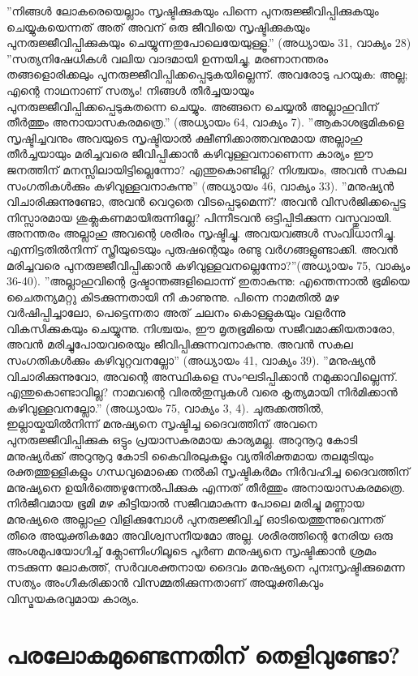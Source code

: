 ''നിങ്ങള്‍ ലോകരെയെല്ലാം സൃഷ്ടിക്കുകയും പിന്നെ പുനരുജ്ജീവിപ്പിക്കുകയും ചെയ്യുകയെന്നത് അത് അവന് ഒരു ജീവിയെ സൃഷ്ടിക്കുകയും പുനരുജ്ജീവിപ്പിക്കുകയും ചെയ്യുന്നതുപോലെയേയുള്ളൂ.'' (അധ്യായം 31, വാക്യം 28)
''സത്യനിഷേധികള്‍ വലിയ വാദമായി ഉന്നയിച്ചു, മരണാനന്തരം തങ്ങളൊരിക്കലും പുനരുജ്ജീവിപ്പിക്കപ്പെടുകയില്ലെന്ന്. അവരോടു പറയുക: അല്ല; എന്റെ നാഥനാണ് സത്യം! നിങ്ങള്‍ തീര്‍ച്ചയായും പുനരുജ്ജീവിപ്പിക്കപ്പെടുകതന്നെ ചെയ്യും. അങ്ങനെ ചെയ്യല്‍ അല്ലാഹുവിന് തീര്‍ത്തും അനായാസകരമത്രെ.'' (അധ്യായം 64, വാക്യം 7).
''ആകാശഭൂമികളെ സൃഷ്ടിച്ചവനും അവയുടെ സൃഷ്ടിയാല്‍ ക്ഷീണിക്കാത്തവനുമായ അല്ലാഹു തീര്‍ച്ചയായും മരിച്ചവരെ ജീവിപ്പിക്കാന്‍ കഴിവുള്ളവനാണെന്ന കാര്യം ഈ ജനത്തിന് മനസ്സിലായിട്ടില്ലെന്നോ? എന്തുകൊണ്ടില്ല? നിശ്ചയം, അവന്‍ സകല സംഗതികള്‍ക്കും കഴിവുള്ളവനാകുന്നു'' (അധ്യായം 46, വാക്യം 33).
''മനുഷ്യന്‍ വിചാരിക്കുന്നുണ്ടോ, അവന്‍ വെറുതെ വിടപ്പെടുമെന്ന്? അവന്‍ വിസര്‍ജിക്കപ്പെട്ട നിസ്സാരമായ ശുക്ലകണമായിരുന്നില്ലേ? പിന്നീടവന്‍ ഒട്ടിപ്പിടിക്കുന്ന വസ്തുവായി. അനന്തരം അല്ലാഹു അവന്റെ ശരീരം സൃഷ്ടിച്ചു. അവയവങ്ങള്‍ സംവിധാനിച്ചു. എന്നിട്ടതില്‍നിന്ന് സ്ത്രീയുടെയും പുരുഷന്റെയും രണ്ടു വര്‍ഗങ്ങളുണ്ടാക്കി. അവന്‍ മരിച്ചവരെ പുനരുജ്ജീവിപ്പിക്കാന്‍ കഴിവുള്ളവനല്ലെന്നോ?''(അധ്യായം 75, വാക്യം 36-40).
''അല്ലാഹുവിന്റെ ദൃഷ്ടാന്തങ്ങളിലൊന്ന് ഇതാകുന്നു: എന്തെന്നാല്‍ ഭൂമിയെ ചൈതന്യമറ്റു കിടക്കുന്നതായി നീ കാണുന്നു. പിന്നെ നാമതില്‍ മഴ വര്‍ഷിപ്പിച്ചാലോ, പെട്ടെന്നതാ അത് ചലനം കൊള്ളുകയും വളര്‍ന്നു വികസിക്കുകയും ചെയ്യുന്നു. നിശ്ചയം, ഈ മൃതഭൂമിയെ സജീവമാക്കിയതാരോ, അവന്‍ മരിച്ചുപോയവരെയും ജീവിപ്പിക്കുന്നവനാകുന്നു. അവന്‍ സകല സംഗതികള്‍ക്കും കഴിവുറ്റവനല്ലോ'' (അധ്യായം 41, വാക്യം 39).
''മനുഷ്യന്‍ വിചാരിക്കുന്നുവോ, അവന്റെ അസ്ഥികളെ സംഘടിപ്പിക്കാന്‍ നമുക്കാവില്ലെന്ന്. എന്തുകൊണ്ടാവില്ല? നാമവന്റെ വിരല്‍തുമ്പുകള്‍ വരെ കൃത്യമായി നിര്‍മിക്കാന്‍ കഴിവുള്ളവനല്ലോ.'' (അധ്യായം 75, വാക്യം 3, 4).
ചുരുക്കത്തില്‍, ഇല്ലായ്മയില്‍നിന്ന് മനുഷ്യനെ സൃഷ്ടിച്ച ദൈവത്തിന് അവനെ പുനരുജ്ജീവിപ്പിക്കുക ഒട്ടും പ്രയാസകരമായ കാര്യമല്ല. അറുനൂറു കോടി മനുഷ്യര്‍ക്ക് അറുനൂറു കോടി കൈവിരലുകളും വ്യതിരിക്തമായ തലമുടിയും രക്തത്തുള്ളികളും ഗന്ധവുമൊക്കെ നല്‍കി സൃഷ്ടികര്‍മം നിര്‍വഹിച്ച ദൈവത്തിന് മനുഷ്യനെ ഉയിര്‍ത്തെഴുന്നേല്‍പിക്കുക എന്നത് തീര്‍ത്തും അനായാസകരമത്രെ. നിര്‍ജീവമായ ഭൂമി മഴ കിട്ടിയാല്‍ സജീവമാകുന്ന പോലെ മരിച്ചു മണ്ണായ മനുഷ്യരെ അല്ലാഹു വിളിക്കുമ്പോള്‍ പുനരുജ്ജീവിച്ച് ഓടിയെത്തുന്നുവെന്നത് തീരെ അയുക്തികമോ അവിശ്വസനീയമോ അല്ല. ശരീരത്തിന്റെ നേരിയ ഒരു അംശമുപയോഗിച്ച് ക്ലോണിംഗിലൂടെ പൂര്‍ണ മനുഷ്യനെ സൃഷ്ടിക്കാന്‍ ശ്രമം നടക്കുന്ന ലോകത്ത്, സര്‍വശക്തനായ ദൈവം മനുഷ്യനെ പുനഃസൃഷ്ടിക്കുമെന്ന സത്യം അംഗീകരിക്കാന്‍ വിസമ്മതിക്കുന്നതാണ് അയുക്തികവും വിസ്മയകരവുമായ കാര്യം.
\chapter{പരലോകമുണ്ടെന്നതിന് തെളിവുണ്ടോ? }

